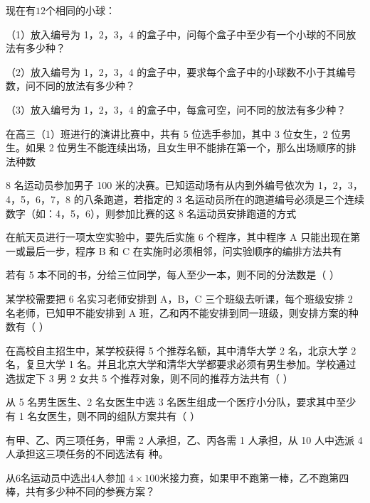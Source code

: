 \begin{homework}
现在有\(12\)个相同的小球：

（1）放入编号为 1，2，3，4 的盒子中，问每个盒子中至少有一个小球的不同放法有多少种？

（2）放入编号为 1，2，3，4 的盒子中，要求每个盒子中的小球数不小于其编号数，问不同的放法有多少种？

（3）放入编号为 1，2，3，4 的盒子中，每盒可空，问不同的放法有多少种？
\end{homework}
\begin{homework}
    在高三（1）班进行的演讲比赛中，共有 5 位选手参加，其中 3 位女生，2 位男生。如果 2 位男生不能连续出场，且女生甲不能排在第一个，那么出场顺序的排法种数
\end{homework}
\begin{homework}
    8 名运动员参加男子 100 米的决赛。已知运动场有从内到外编号依次为 1，2，3，4，5，6，7，8 的八条跑道，若指定的 3 名运动员所在的跑道编号必须是三个连续数字（如：4，5，6），则参加比赛的这 8 名运动员安排跑道的方式
\end{homework}
\begin{homework}
    在航天员进行一项太空实验中，要先后实施 6 个程序，其中程序 A 只能出现在第一或最后一步，程序 B 和 C 在实施时必须相邻，问实验顺序的编排方法共有
\end{homework}
\begin{homework}
    若有 5 本不同的书，分给三位同学，每人至少一本，则不同的分法数是（ ）
\end{homework}
\begin{homework}
    某学校需要把 6 名实习老师安排到 A，B，C 三个班级去听课，每个班级安排 2 名老师，已知甲不能安排到 A 班，乙和丙不能安排到同一班级，则安排方案的种数有（ ）

\end{homework}
\begin{homework}
    在高校自主招生中，某学校获得 5 个推荐名额，其中清华大学 2 名，北京大学 2 名，复旦大学 1 名。并且北京大学和清华大学都要求必须有男生参加。学校通过选拔定下 3 男 2 女共 5 个推荐对象，则不同的推荐方法共有（ ）
\end{homework}
\begin{homework}
    从 5 名男生医生、2 名女医生中选 3 名医生组成一个医疗小分队，要求其中至少有 1 名女医生，则不同的组队方案共有（ ）
\end{homework}
\begin{homework}
    有甲、乙、丙三项任务，甲需 2 人承担，乙、丙各需 1 人承担，从 10 人中选派 4 人承担这三项任务的不同选法有 种。
\end{homework}
\begin{homework}
    从\(6\)名运动员中选出\(4\)人参加 \(4\times 100\)米接力赛，如果甲不跑第一棒，乙不跑第四棒，共有多少种不同的参赛方案？
\end{homework}
\begin{homework}
    
\end{homework}
\begin{homework}
    
\end{homework}
\begin{homework}
    
\end{homework}




\clearpage
